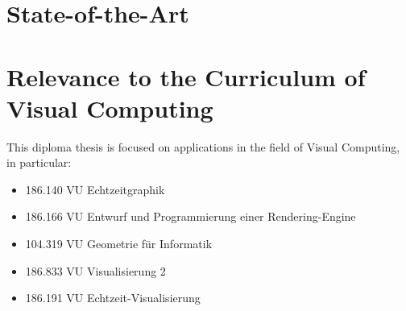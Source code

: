 \documentclass[]{article}
\begin{document}
\section{State-of-the-Art}


\section{Relevance to the Curriculum of Visual Computing}

This diploma thesis is focused on applications in the field of Visual Computing, in particular: 

\begin{itemize}
	\item 186.140 VU Echtzeitgraphik
	\item 186.166 VU Entwurf und Programmierung einer Rendering-Engine
	\item 104.319 VU Geometrie für Informatik
	\item 186.833 VU Visualisierung 2
	\item 186.191 VU Echtzeit-Visualisierung
\end{itemize}



\end{document}
